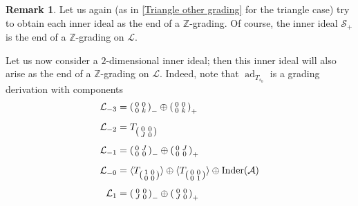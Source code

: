 \documentclass[oneside,a4paper]{amsart} %
\theoremstyle{definition}
\newtheorem{remark}[theorem]{Remark}
\DeclareMathOperator{\Inder}{Inder}
\DeclareMathOperator{\ad}{ad}
\newcommand{\A}{\mathcal{A}}
\renewcommand{\SS}{\mathcal{S}}
\newcommand{\LL}{\mathcal{L}}
\numberwithin{equation}{section}
\begin{document}
\begin{remark}
\label{Hexagon other grading}
    Let us again (as in \cref{Triangle other grading} for the triangle case) try to obtain each inner ideal as the end of a $\mathbb Z$-grading.
	Of course, the inner ideal $\SS_+$ is the end of a $\mathbb Z$-grading on $\LL$.
	
	Let us now consider a $2$-dimensional inner ideal; then this inner ideal will also arise as the end of a $\mathbb Z$-grading on $\LL$.
	Indeed, note that $\ad_{T_{s_0}}$ is a grading derivation with components
	\begin{align*}
		\LL_{-3}&= \begin{psmallmatrix} 0 & 0 \\ 0 & k \end{psmallmatrix}_-\oplus \begin{psmallmatrix} 0 & 0 \\ 0 & k \end{psmallmatrix}_+\\[1ex]
		\LL_{-2}&= T_{\begin{psmallmatrix}
			0 & 0 \\ J & 0
		\end{psmallmatrix} }\\[1ex]
		\LL_{-1}&= \begin{psmallmatrix} 0 & J \\ 0 & 0 \end{psmallmatrix}_-\oplus \begin{psmallmatrix} 0 & J \\ 0 & 0 \end{psmallmatrix}_+\\[1ex]
		\LL_{-0}&=  \langle T_{\begin{psmallmatrix}
			1 & 0 \\ 0 & 0
		\end{psmallmatrix}}\rangle \oplus \langle T_{\begin{psmallmatrix}
			0 & 0 \\ 0 & 1
		\end{psmallmatrix}}\rangle\oplus \Inder(\A)\\[1ex]
		\LL_{1}&= \begin{psmallmatrix} 0 & 0 \\ J & 0 \end{psmallmatrix}_-\oplus \begin{psmallmatrix} 0 & 0 \\ J & 0 \end{psmallmatrix}_+\\[1ex]

\end{align*}
\end{remark}
\end{document}
